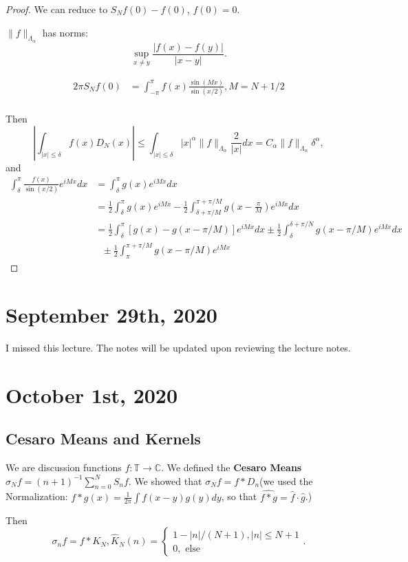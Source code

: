 \documentclass[11pt]{scrartcl}
\newcommand{\C}{\mathbb C}
\newcommand{\T}{\mathbb T}
\let \hat \widehat
\newcommand{\<}{\langle}
\renewcommand{\>}{\rangle}
\begin{document}
\begin{proof}
We can reduce to $S_Nf(0) - f(0)$, $f(0) = 0$.

$\|f\|_{\Lambda_\alpha}$ has norms: $$\sup_{x \ne y} \frac{|f(x) - f(y)|}{|x-y|}.$$

\begin{align*}
2\pi S_Nf(0) &=\int_{-\pi}^{\pi} f(x) \frac{\sin(Mx)}{\sin(x/2)}, M = N+1/2\\
\end{align*}

Then 
$$\left |\int_{|x| \le \delta}f(x)D_N(x)\right | \le \int_{|x| \le \delta} |x|^{\alpha}\|f\|_{\Lambda_\alpha}\frac{2}{|x|}dx = C_\alpha \|f\|_{\Lambda_\alpha}\delta^{\alpha},$$
and 
\begin{align*}
\int_{\delta}^\pi \frac{f(x)}{\sin(x/2)} e^{iMx}dx &= \int_{\delta}^\pi g(x)e^{iMx} dx\\
&= \frac{1}{2} \int_{\delta}^\pi g(x)e^{iMx} - \frac{1}{2} \int_{\delta + \pi/M}^{\pi + \pi/M} g\left (x-\frac{\pi}{M}\right )e^{iMx}dx\\
&= \frac{1}{2}\int_{\delta}^\pi [g(x) - g(x-\pi/M)]e^{iMx}dx \pm \frac{1}{2} \int_{\delta}^{\delta+\pi/N} g(x - \pi/M)e^{iMx}dx\\ &\text{               }\pm \frac{1}{2} \int_{\pi}^{\pi+\pi/M} g(x-\pi/M)e^{iMx}
\end{align*}

\end{proof}
\pagebreak
\section{September 29th, 2020}
I missed this lecture.  The notes will be updated upon reviewing the lecture notes.
\pagebreak
\section{October 1st, 2020}
\subsection{Cesaro Means and Kernels}
We are discussion functions $f : \T \rightarrow \C$.  We defined the \textbf{Cesaro Means} $\sigma_N f = (n+1)^{-1}\sum_{n =0}^N S_n f$.  We showed that $\sigma_N f = f * D_n $(we used the Normalization: $f * g(x) = \frac{1}{2\pi}\int f(x-y)g(y)dy$, so that $\hat{f*g} = \hat{f}\cdot\hat{g}$.)  

Then
$$\sigma_n f = f * K_N, \hat{K}_N(n) = \begin{cases} 1 - |n|/(N+1), |n| \le N+1 \\ 0, \text{ else}\end{cases}.$$
\end{document}
